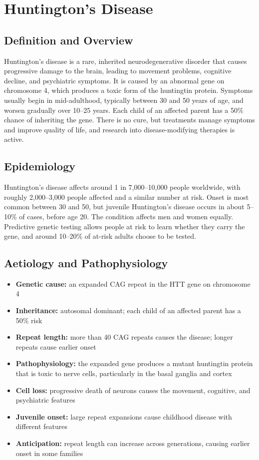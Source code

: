 \chapter{Huntington's Disease}

\section*{Definition and Overview}
Huntington's disease is a rare, inherited neurodegenerative disorder that causes progressive damage to the brain, leading to movement problems, cognitive decline, and psychiatric symptoms. It is caused by an abnormal gene on chromosome 4, which produces a toxic form of the huntingtin protein. Symptoms usually begin in mid-adulthood, typically between 30 and 50 years of age, and worsen gradually over 10--25 years. Each child of an affected parent has a 50\% chance of inheriting the gene. There is no cure, but treatments manage symptoms and improve quality of life, and research into disease-modifying therapies is active.

\section*{Epidemiology}
Huntington's disease affects around 1 in 7,000--10,000 people worldwide, with roughly 2,000--3,000 people affected and a similar number at risk. Onset is most common between 30 and 50, but juvenile Huntington's disease occurs in about 5--10\% of cases, before age 20. The condition affects men and women equally. Predictive genetic testing allows people at risk to learn whether they carry the gene, and around 10--20\% of at-risk adults choose to be tested.

\section*{Aetiology and Pathophysiology}
\begin{itemize}
    \item \textbf{Genetic cause:} an expanded CAG repeat in the HTT gene on chromosome 4
    \item \textbf{Inheritance:} autosomal dominant; each child of an affected parent has a 50\% risk
    \item \textbf{Repeat length:} more than 40 CAG repeats causes the disease; longer repeats cause earlier onset
    \item \textbf{Pathophysiology:} the expanded gene produces a mutant huntingtin protein that is toxic to nerve cells, particularly in the basal ganglia and cortex
    \item \textbf{Cell loss:} progressive death of neurons causes the movement, cognitive, and psychiatric features
    \item \textbf{Juvenile onset:} large repeat expansions cause childhood disease with different features
    \item \textbf{Anticipation:} repeat length can increase across generations, causing earlier onset in some families
\end{itemize}

